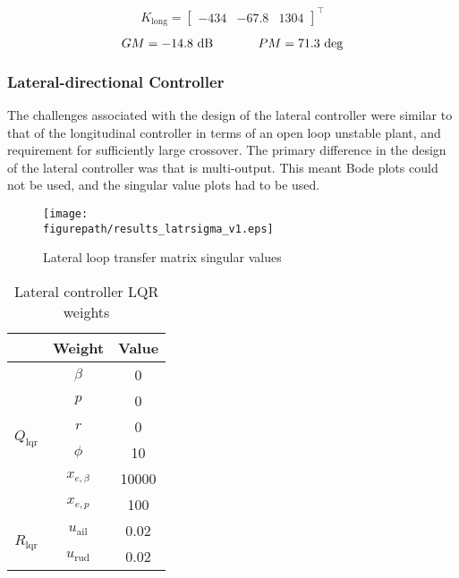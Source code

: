 \begin{equation*}
  {K_{\text{long}}}=
  \left[
  \begin{array}{ccc}
    -434 & -67.8 & 1304
  \end{array}\right]^{\top}
\end{equation*}

\begin{equation*}
  GM=-14.8\text{~dB}
  \hspace{0.5in}
  PM=71.3\text{~deg}
\end{equation*}

\subsubsection*{Lateral-directional Controller}

The challenges associated with the design of the lateral controller were similar to that of the longitudinal controller in terms of an open loop unstable plant, and requirement for sufficiently large crossover.
The primary difference in the design of the lateral controller was that is multi-output.
This meant Bode plots could not be used, and the singular value plots had to be used.

\begin{figure}[h]
  \begin{center}
    \texttt{[image: \\figurepath/results\_latrsigma\_v1.eps]}
    \caption{Lateral loop transfer matrix singular values\label{fig:latrsigma}}
  \end{center}
\end{figure}

\begin{table}[h]
  \centering
  \caption{Lateral controller LQR weights}
  \small
  \begin{tabular}{ccc}
    \toprule
    & Weight & Value \\
    \midrule
    \multirow{6}{*}{$Q_{\text{lqr}}$} & $\beta$ & 0 \\
    & $p$ & 0 \\
    & $r$ & 0 \\
    & $\phi$ & 10 \\
    & $x_{e,\beta}$ & 10000 \\
    & $x_{e,p}$ & 100 \\
    \midrule
    \multirow{2}{*}{$R_{\text{lqr}}$} & $u_{\text{ail}}$ & 0.02 \\
    & $u_{\text{rud}}$ & 0.02 \\
    \bottomrule
  \end{tabular}\label{latr_weights_tab}
\end{table}

